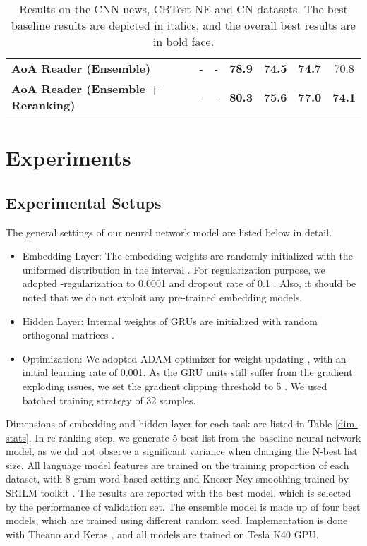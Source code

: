 \documentclass[11pt,a4paper]{article}
\begin{document}
\begin{table*}[h]
\begin{center}
\begin{tabular}{lcccccc}
        \hline
        {\bf AoA Reader (Ensemble)} & - & - & {\bf 78.9} & {\bf 74.5} & {\bf 74.7} &  70.8 \\
        {\bf AoA Reader (Ensemble + Reranking)} & - & - & {\bf 80.3} & {\bf 75.6} & {\bf 77.0} &  {\bf 74.1} \\
        \bottomrule
        \end{tabular}
        \end{center}
        \caption{\label{public-result} Results on the CNN news, CBTest NE and CN datasets. The best baseline results are depicted in italics, and the overall best results are in bold face. 
         }
        \end{table*}
        
\section{Experiments}\label{experiments}

\subsection{Experimental Setups} 
        
The general settings of our neural network model are listed below in detail.

\begin{itemize}
  \item Embedding Layer: The embedding weights are randomly initialized with the uniformed distribution in the interval . For regularization purpose, we adopted -regularization to 0.0001 and dropout rate of 0.1 \cite{srivastava-etal-2014}. Also, it should be noted that we do not exploit any pre-trained embedding models.
  \item Hidden Layer: Internal weights of GRUs are initialized with random orthogonal matrices \cite{saxe2013exact}.
  \item Optimization: We adopted ADAM optimizer for weight updating \cite{kingma2014adam}, with an initial learning rate of 0.001. As the GRU units still suffer from the gradient exploding issues, we set the gradient clipping threshold to 5 \cite{pascanu-etal-2013}. We used batched training strategy of 32 samples.
\end{itemize}

Dimensions of embedding and hidden layer for each task are listed in Table \ref{dim-stats}.
In re-ranking step, we generate 5-best list from the baseline neural network model, as we did not observe a significant variance when changing the N-best list size.
All language model features are trained on the training proportion of each dataset, with 8-gram word-based setting and Kneser-Ney smoothing \cite{kneser-1995} trained by SRILM toolkit \cite{stolcke-2002}.
The results are reported with the best model, which is selected by the performance of validation set.
The ensemble model is made up of four best models, which are trained using different random seed.
Implementation is done with Theano \cite{theano2016} and Keras \cite{chollet2015keras}, and all models are trained on Tesla K40 GPU.
\end{document}
